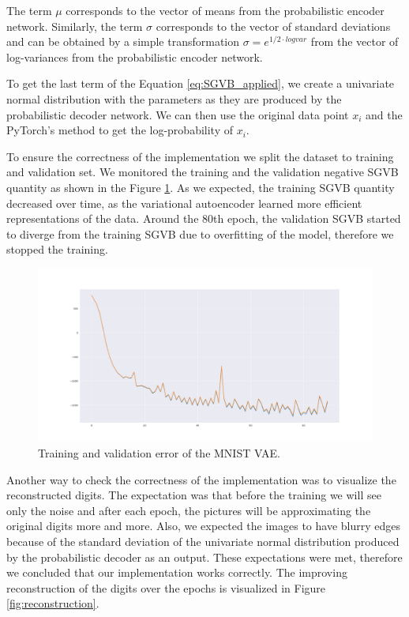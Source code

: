 The term $\mu$ corresponds to the vector of means from the probabilistic encoder network.
Similarly, the term $\sigma$ corresponds to the vector of standard deviations and can be obtained by a simple transformation $\sigma = e^{1/2\cdot logvar}$ from the vector of log-variances from the probabilistic encoder network.

To get the last term of the Equation \ref{eq:SGVB_applied}, we create a univariate normal distribution with the parameters as they are produced by the probabilistic decoder network. We can then use the original data point $x_i$ and the PyTorch's method to get the log-probability of $x_i$.

To ensure the correctness of the implementation we split the dataset to training and validation set.
We monitored the training and the validation negative SGVB quantity as shown in the Figure \ref{fig:train_test_error}.
As we expected, the training SGVB quantity decreased over time, as the variational autoencoder learned more efficient representations of the data.
Around the 80th epoch, the validation SGVB started to diverge from the training SGVB due to overfitting of the model, therefore we stopped the training.

\begin{figure}[H]
    \centering
    \includegraphics[width=\linewidth]{images/train_test_error.png}
    \caption{Training and validation error of the MNIST VAE.}
    \label{fig:train_test_error}
\end{figure}

Another way to check the correctness of the implementation was to visualize the reconstructed digits.
The expectation was that before the training we will see only the noise and after each epoch, the pictures will be approximating the original digits more and more.
Also, we expected the images to have blurry edges because of the standard deviation of the univariate normal distribution produced by the probabilistic decoder as an output.
These expectations were met, therefore we concluded that our implementation works correctly.
The improving reconstruction of the digits over the epochs is visualized in Figure \ref{fig:reconstruction}.

